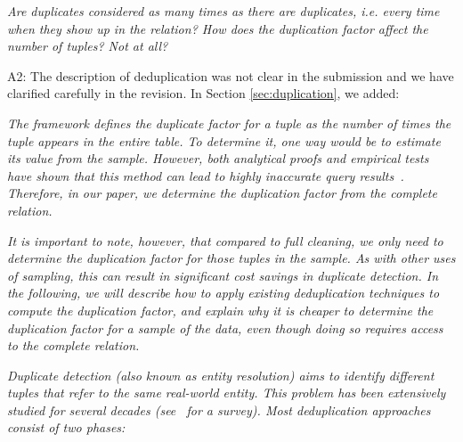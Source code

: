 \emph{Are duplicates considered as many times as there are duplicates, i.e. every time when they show up in the relation? How does the duplication factor affect the number of tuples? Not at all? }



A2: %
%
%
The description of deduplication was not clear in the submission and we have clarified carefully in the revision.
In Section \ref{sec:duplication}, we added:
\newline

\noindent \textit{The \saqpplus framework defines the duplicate factor for a tuple as the number of times the tuple appears in the entire table. To determine it, one way would be to estimate its value from the sample. However, both analytical proofs and empirical tests have shown that this method can lead to highly inaccurate query results~\cite{charikar2000towards}.
Therefore, in our paper, we determine the duplication factor from the complete relation. 
} 


\iffalse
Duplicate detection or entity resolution has been extensively studied for several decades~\cite{DBLP:journals/tkde/ElmagarmidIV07}.
\saqpplus needs an estimate of the duplication rate for a tuple which we define as the number of times the tuple has been duplicated in the entire table.
It is known that estimating the duplication rate from only searching in a sample leads to inaccurate query results~\cite{charikar2000towards}.
Consequently, we cannot avoid a scan of the entire table to clean this error type.}
\fi

\textit{It is important to note, however, that compared to full cleaning, we only need to determine the duplication factor for those tuples in the sample. As with other uses of sampling, this can result in significant cost savings in duplicate detection.
In the following, we will describe how to apply existing deduplication techniques to compute the duplication factor, and explain why it is cheaper to determine the duplication factor for a sample of the data, even though doing so requires access to the complete relation.}


\textit{Duplicate detection (also known as entity resolution) aims to identify different tuples that refer to the same real-world entity. This problem has been extensively studied for several decades (see~\cite{DBLP:journals/tkde/ElmagarmidIV07} for a survey).  
Most deduplication approaches consist of two phases:} 

